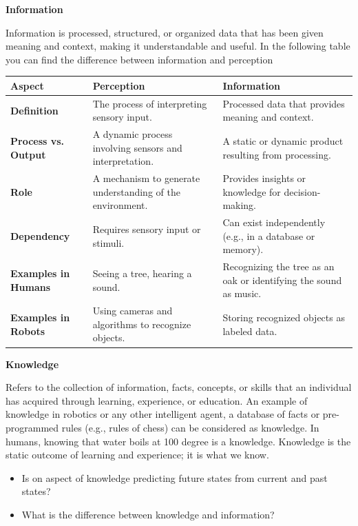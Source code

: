 \documentclass{book}
\providecommand{\ProjectDeepHeading}[2]{%
    \par\medskip\noindent\textbf{#2}\par\smallskip
}
\begin{document}
        
        \ProjectDeepHeading{4}{Information} Information is processed, structured, or organized data that has been given meaning and context, making it understandable and useful. In the following table you can find the difference between information and perception
            \begin{tabular}{|l|l|l|}
                \hline
                \textbf{Aspect}             & \textbf{Perception}                                       & \textbf{Information}                                              \\ \hline
                \textbf{Definition}         & The process of interpreting sensory input.                & Processed data that provides meaning and context.                 \\ \hline
                \textbf{Process vs. Output} & A dynamic process involving sensors and interpretation. & A static or dynamic product resulting from processing. \\ \hline
                \textbf{Role}               & A mechanism to generate understanding of the environment. & Provides insights or knowledge for decision-making.               \\ \hline
                \textbf{Dependency}         & Requires sensory input or stimuli.                        & Can exist independently (e.g., in a database or memory).          \\ \hline
                \textbf{Examples in Humans} & Seeing a tree, hearing a sound.                           & Recognizing the tree as an oak or identifying the sound as music. \\ \hline
                \textbf{Examples in Robots} & Using cameras and algorithms to recognize objects.        & Storing recognized objects as labeled data.                       \\ \hline
            \end{tabular}
        
        
        \ProjectDeepHeading{4}{Knowledge}
            Refers to the collection of information, facts, concepts, or skills that an individual has acquired through learning, experience, or education. An example of knowledge in robotics or any other intelligent agent, a database of facts or pre-programmed rules (e.g., rules of chess) can be considered as knowledge. In humans, knowing that water boils at 100 degree is a knowledge. Knowledge is the static outcome of learning and experience; it is what we know.
            \begin{itemize}
                \item Is on aspect of knowledge predicting future states from current and past states?
                \item What is the difference between knowledge and information?
            \end{itemize}
        
\end{document}
